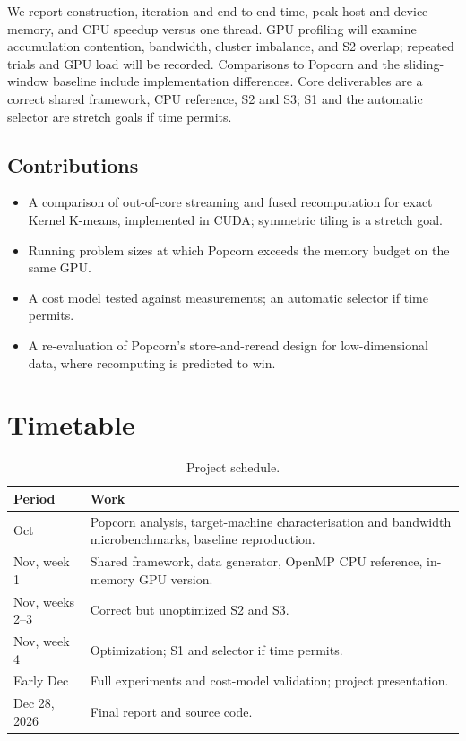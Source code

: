 \documentclass[sigconf]{acmart}
\begin{document}
We report construction, iteration and end-to-end time, peak host and device
memory, and CPU speedup versus one thread. GPU profiling will examine
accumulation contention, bandwidth, cluster imbalance, and S2 overlap;
repeated trials and GPU load will be recorded. Comparisons to Popcorn and the
sliding-window baseline include implementation differences. Core deliverables
are a correct shared framework, CPU reference, S2 and S3; S1 and the automatic
selector are stretch goals if time permits.

\subsection{Contributions}

\begin{itemize}
  \item A comparison of out-of-core streaming and fused recomputation for
        exact Kernel K-means, implemented in CUDA; symmetric tiling is a
        stretch goal.
  \item Running problem sizes at which Popcorn exceeds the memory budget on
        the same GPU.
  \item A cost model tested against measurements; an automatic selector if
        time permits.
  \item A re-evaluation of Popcorn's store-and-reread design for
        low-dimensional data, where recomputing is predicted to win.
\end{itemize}

\section{Timetable}

\begin{table}[H]
  \caption{Project schedule.}
  \label{tab:plan}
  \small
  \begin{tabular}{p{}p{}}
    \toprule
    Period & Work \\
    \midrule
    Oct & Popcorn analysis, target-machine characterisation and bandwidth
          microbenchmarks, baseline reproduction. \\
    Nov, week 1 & Shared framework, data generator, OpenMP CPU reference,
                  in-memory GPU version. \\
    Nov, weeks 2--3 & Correct but unoptimized S2 and S3. \\
    Nov, week 4 & Optimization; S1 and selector if time permits. \\
    Early Dec & Full experiments and cost-model validation; project
                presentation. \\
    Dec 28, 2026 & Final report and source code. \\
    \bottomrule
  \end{tabular}
\end{table}
\end{document}
